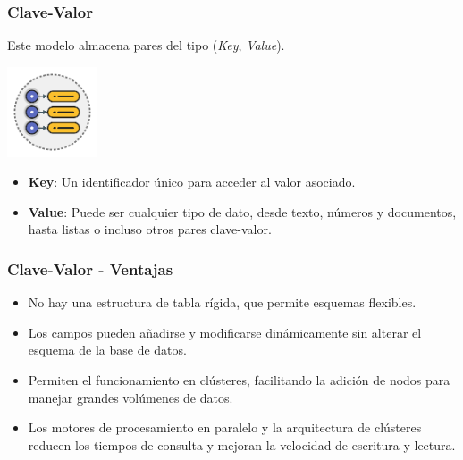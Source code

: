\begin{frame}
    \frametitle{Clave-Valor}

    Este modelo almacena pares del tipo (\textit{Key}, \textit{Value}).

    \begin{center}
    \includegraphics[width=0.2\textwidth]{diagramas/KeyValue.png}
    \end{center}
                    
     
        
     \begin{itemize}
        \item \textbf{Key}: Un identificador único para acceder al valor asociado.
         \item \textbf{Value}: Puede ser cualquier tipo de dato, desde texto, números y documentos, hasta listas o incluso otros pares clave-valor.
     
     \end{itemize}

\end{frame}

\begin{frame}
    \frametitle{Clave-Valor - Ventajas}
     \begin{itemize}
     
        \item No hay una estructura de tabla rígida, que permite esquemas flexibles.       
        
        \item Los campos pueden añadirse y modificarse dinámicamente sin alterar el esquema de la base de datos.
        
        \item Permiten el funcionamiento en clústeres, facilitando la adición de nodos para manejar grandes volúmenes de datos.
        
        \item Los motores de procesamiento en paralelo y la arquitectura de clústeres reducen los tiempos de consulta y mejoran la velocidad de escritura y lectura.
     
     \end{itemize}
\end{frame}


